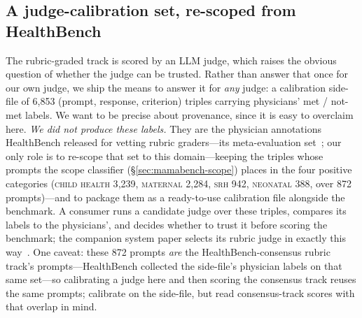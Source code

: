 \subsection{A judge-calibration set, re-scoped from HealthBench}
\label{sec:mamabench-calibration}

The rubric-graded track is scored by an LLM judge, which raises the obvious
question of whether the judge can be trusted. Rather than answer that once for
our own judge, we ship the means to answer it for \emph{any} judge: a
calibration side-file of 6{,}853 (prompt, response, criterion) triples carrying
physicians' met / not-met labels. We want to be precise about provenance, since
it is easy to overclaim here. \emph{We did not produce these labels.} They are
the physician annotations HealthBench released for vetting rubric graders---its
meta-evaluation set~\cite{arora2025healthbench}; our only role is to re-scope
that set to this domain---keeping the triples whose prompts the scope classifier
(\S\ref{sec:mamabench-scope}) places in the four positive categories
(\textsc{child health} 3{,}239, \textsc{maternal} 2{,}284, \textsc{srh} 942,
\textsc{neonatal} 388, over 872 prompts)---and to package them as a ready-to-use
calibration file alongside the benchmark. A consumer runs a candidate judge over
these triples, compares its labels to the physicians', and decides whether to
trust it before scoring the benchmark; the companion system paper selects its
rubric judge in exactly this way~\cite{ren2026mamai}. One caveat: these 872
prompts \emph{are} the HealthBench-consensus rubric track's prompts---HealthBench
collected the side-file's physician labels on that same set---so calibrating a
judge here and then scoring the consensus track reuses the same prompts;
calibrate on the side-file, but read consensus-track scores with that overlap in
mind.
